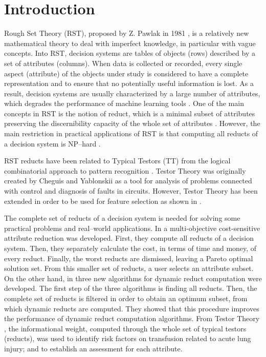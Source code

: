 \documentclass[number,preprint,review,12pt]{elsarticle}
\begin{document}
\section{Introduction}
  Rough Set Theory (RST), proposed by Z. Pawlak in 1981 \citep{Pawlak81,Pawlak81-2,Pawlak82,Pawlak91}, 
  is a relatively new mathematical theory to deal with imperfect knowledge, in particular with vague 
  concepts. Into RST, decision systems are tables of objects (rows) described by a set of attributes (columns). 
  When data is collected or recorded, every single aspect (attribute) of the objects under study is
  considered to have a complete representation and to ensure that no potentially useful information is lost. As a result, decision systems are usually characterized by a large number of attributes, which degrades the performance of machine learning tools \citep{Parthalain08}. One of the main concepts in RST is the notion of reduct, which is a minimal subset of attributes preserving the discernibility capacity of the whole set of attributes \citep{Pawlak91}. However, the main restriction in practical applications of RST is that computing all reducts of a decision system is NP--hard \citep{Skowron92}. 
   
   RST reducts have been related to Typical Testors (TT) from the logical combinatorial approach to pattern recognition \citep{Chikalov2013}. Testor Theory was originally created by Cheguis and Yablonskii \cite{Cheguis55} as a tool for analysis of problems connected with control and diagnosis of faults in circuits.  However, Testor Theory has been extended in order to be used for feature selection as shown in \citep{Dmitriev1966,Martinez01,Ruiz08}.

  The complete set of reducts of a decision system is needed for solving some practical problems and real--world applications. In \cite{Xu2013} a multi-objective cost-sensitive attribute reduction was developed. First, they compute all reducts of a decision system. Then, they separately calculate the cost, in terms of time and money, of every reduct. Finally, the worst reducts are dismissed, leaving a Pareto optimal solution set. From this smaller set of reducts, a user selects an attribute subset. On the other hand, in \cite{Mukamakuza2014} three new algorithms for dynamic reduct computation were developed. The first step of the three algorithms is finding all reducts. Then, the complete set of reducts is filtered in order to obtain an optimum subset, from which dynamic reducts are computed. They showed that this procedure improves the performance of dynamic reduct computation algorithms. From Testor Theory \cite{Torres2014}, the informational weight, computed through the whole set of typical testors (reducts), was used to identify risk factors on transfusion related to acute lung injury; and to establish an assessment for each attribute.  
  
\end{document}
